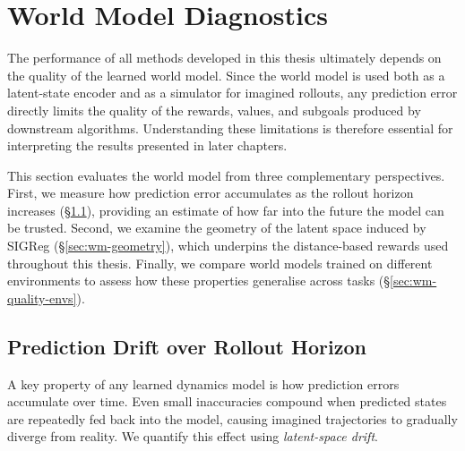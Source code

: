 \section{World Model Diagnostics}
\label{sec:wm-quality}

The performance of all methods developed in this thesis ultimately
depends on the quality of the learned world model. Since the world
model is used both as a latent-state encoder and as a simulator for
imagined rollouts, any prediction error directly limits the quality of
the rewards, values, and subgoals produced by downstream algorithms.
Understanding these limitations is therefore essential for interpreting
the results presented in later chapters.

This section evaluates the world model from three complementary
perspectives. First, we measure how prediction error accumulates as
the rollout horizon increases (\S\ref{sec:wm-drift}), providing an
estimate of how far into the future the model can be trusted. Second,
we examine the geometry of the latent space induced by SIGReg
(\S\ref{sec:wm-geometry}), which underpins the distance-based rewards
used throughout this thesis. Finally, we compare world models trained
on different environments to assess how these properties generalise
across tasks (\S\ref{sec:wm-quality-envs}).


\subsection{Prediction Drift over Rollout Horizon}
\label{sec:wm-drift}

A key property of any learned dynamics model is how prediction errors
accumulate over time. Even small inaccuracies compound when predicted
states are repeatedly fed back into the model, causing imagined
trajectories to gradually diverge from reality. We quantify this
effect using \emph{latent-space drift}.

